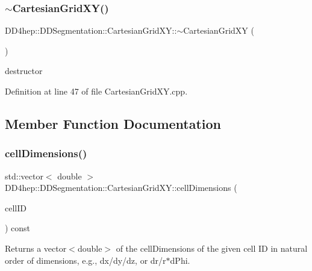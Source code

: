 \subsubsection{\texorpdfstring{$\sim$\+Cartesian\+Grid\+X\+Y()}{~CartesianGridXY()}}
{\footnotesize\ttfamily D\+D4hep\+::\+D\+D\+Segmentation\+::\+Cartesian\+Grid\+X\+Y\+::$\sim$\+Cartesian\+Grid\+XY (\begin{DoxyParamCaption}{ }\end{DoxyParamCaption})\hspace{0.3cm}{\ttfamily [virtual]}}



destructor 



Definition at line 47 of file Cartesian\+Grid\+X\+Y.\+cpp.



\subsection{Member Function Documentation}
\hypertarget{class_d_d4hep_1_1_d_d_segmentation_1_1_cartesian_grid_x_y_a4e6684098e023a26f7f338190c394e0e}{}\label{class_d_d4hep_1_1_d_d_segmentation_1_1_cartesian_grid_x_y_a4e6684098e023a26f7f338190c394e0e} 
\subsubsection{\texorpdfstring{cell\+Dimensions()}{cellDimensions()}}
{\footnotesize\ttfamily std\+::vector$<$ double $>$ D\+D4hep\+::\+D\+D\+Segmentation\+::\+Cartesian\+Grid\+X\+Y\+::cell\+Dimensions (\begin{DoxyParamCaption}\item[{const \hyperlink{namespace_d_d4hep_1_1_d_d_segmentation_ac7af071d85cb48820914434a07e21ba1}{Cell\+ID} \&}]{cell\+ID }\end{DoxyParamCaption}) const\hspace{0.3cm}{\ttfamily [virtual]}}



Returns a vector$<$double$>$ of the cell\+Dimensions of the given cell ID in natural order of dimensions, e.\+g., dx/dy/dz, or dr/r$\ast$d\+Phi. 

